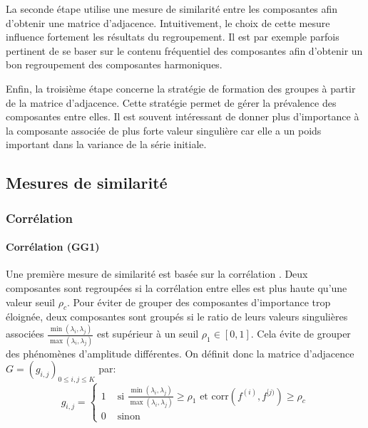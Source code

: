 \documentclass{gretsi}
\newcommand{\inter}{\left[0, 1\right]}
\begin{document}
La seconde étape utilise une mesure de similarité entre les composantes afin d'obtenir une matrice d'adjacence. Intuitivement, le choix de cette mesure influence fortement les résultats du regroupement. Il est par exemple parfois pertinent de se  baser sur le contenu fréquentiel des composantes afin d'obtenir un bon regroupement des composantes harmoniques.

Enfin, la troisième étape concerne la stratégie de formation des groupes à partir de la matrice d'adjacence. Cette stratégie permet de gérer la prévalence des composantes entre elles. Il est souvent intéressant de donner plus d'importance à la composante associée de plus forte valeur singulière car elle a un poids important dans la variance de la série initiale.


\subsection{Mesures de similarité}
\label{sub:sim}

\subsubsection{Corrélation}\label{ssub:cor}
\paragraph{Corrélation (GG1)}\label{par:GG1}
    Une première mesure de similarité est basée sur la corrélation \cite{abalov_14_auto}. Deux composantes sont regroupées si la corrélation entre elles est plus haute qu'une valeur seuil $\rho_c$. Pour éviter de grouper des composantes d'importance trop éloignée, deux composantes sont groupés si le ratio de leurs valeurs singulières associées $\frac{\min(\lambda_i, \lambda_j)}{\max(\lambda_i, \lambda_j)}$ est supérieur à un seuil $\rho_1 \in \inter$. Cela évite de grouper des phénomènes d'amplitude différentes. On définit donc la matrice d'adjacence $G = (g_{i, j})_{0 \le i,j\le K}$ par:
    $$
    g_{i, j} = \begin{cases}
	    1 &\text{ si } \displaystyle\frac{\min(\lambda_i, \lambda_j)}{\max(\lambda_i, \lambda_j)} \ge \rho_1 \text{ et } \text{corr}(f^{(i)}, f^{[j)}) \ge \rho_c\\
	    0& \text{ sinon}
    \end{cases}
    $$
\end{document}
